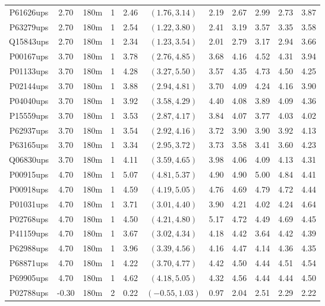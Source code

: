 \begin{landscape}
\begin{longtable}{cccc|cc|ccccc}
  P61626ups & 2.70 & 180m &   1 & 2.46 & $(1.76, 3.14)$ & 2.19 & 2.67 & 2.99 & 2.73 & 3.87 \\ 
  P63279ups & 2.70 & 180m &   1 & 2.54 & $(1.22, 3.80)$ & 2.41 & 3.19 & 3.57 & 3.35 & 3.58 \\ 
  Q15843ups & 2.70 & 180m &   1 & 2.34 & $(1.23, 3.54)$ & 2.01 & 2.79 & 3.17 & 2.94 & 3.66 \\ 
  P00167ups & 3.70 & 180m &   1 & 3.78 & $(2.76, 4.85)$ & 3.68 & 4.16 & 4.52 & 4.31 & 3.94 \\ 
  P01133ups & 3.70 & 180m &   1 & 4.28 & $(3.27, 5.50)$ & 3.57 & 4.35 & 4.73 & 4.50 & 4.25 \\ 
  P02144ups & 3.70 & 180m &   1 & 3.88 & $(2.94, 4.81)$ & 3.70 & 4.09 & 4.24 & 4.16 & 3.90 \\ 
  P04040ups & 3.70 & 180m &   1 & 3.92 & $(3.58, 4.29)$ & 4.40 & 4.08 & 3.89 & 4.09 & 4.36 \\ 
  P15559ups & 3.70 & 180m &   1 & 3.53 & $(2.87, 4.17)$ & 3.84 & 4.07 & 3.77 & 4.03 & 4.02 \\ 
  P62937ups & 3.70 & 180m &   1 & 3.54 & $(2.92, 4.16)$ & 3.72 & 3.90 & 3.90 & 3.92 & 4.13 \\ 
  P63165ups & 3.70 & 180m &   1 & 3.34 & $(2.95, 3.72)$ & 3.73 & 3.58 & 3.41 & 3.60 & 4.23 \\ 
  Q06830ups & 3.70 & 180m &   1 & 4.11 & $(3.59, 4.65)$ & 3.98 & 4.06 & 4.09 & 4.13 & 4.31 \\ 
  P00915ups & 4.70 & 180m &   1 & 5.07 & $(4.81, 5.37)$ & 4.90 & 4.90 & 5.00 & 4.84 & 4.41 \\ 
  P00918ups & 4.70 & 180m &   1 & 4.59 & $(4.19, 5.05)$ & 4.76 & 4.69 & 4.79 & 4.72 & 4.44 \\ 
  P01031ups & 4.70 & 180m &   1 & 3.71 & $(3.01, 4.40)$ & 3.90 & 4.21 & 4.02 & 4.24 & 4.64 \\ 
  P02768ups & 4.70 & 180m &   1 & 4.50 & $(4.21, 4.80)$ & 5.17 & 4.72 & 4.49 & 4.69 & 4.45 \\ 
  P41159ups & 4.70 & 180m &   1 & 3.67 & $(3.02, 4.34)$ & 4.18 & 4.42 & 3.64 & 4.42 & 4.39 \\ 
  P62988ups & 4.70 & 180m &   1 & 3.96 & $(3.39, 4.56)$ & 4.16 & 4.47 & 4.14 & 4.36 & 4.35 \\ 
  P68871ups & 4.70 & 180m &   1 & 4.22 & $(3.70, 4.77)$ & 4.42 & 4.50 & 4.44 & 4.51 & 4.54 \\ 
  P69905ups & 4.70 & 180m &   1 & 4.62 & $(4.18, 5.05)$ & 4.32 & 4.56 & 4.44 & 4.44 & 4.50 \\ 
  P02788ups & -0.30 & 180m &   2 & 0.22 & $(-0.55, 1.03)$ & 0.97 & 2.04 & 2.51 & 2.29 & 2.22 \\ 

\end{longtable}
\end{landscape}
